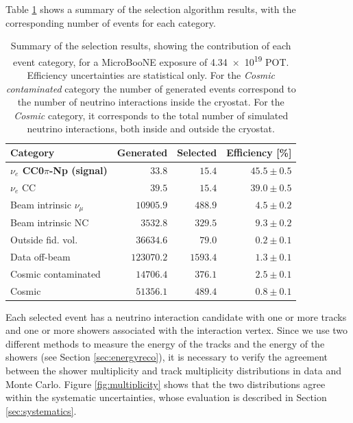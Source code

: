 Table \ref{tab:result} shows a summary of the selection algorithm results, with the corresponding number of events for each category.

\begin{table}[htbp]
   \centering
      \caption{Summary of the selection results, showing the contribution of each event category, for a MicroBooNE exposure of \num{4.34e19} POT. Efficiency uncertainties are statistical only. {For the \emph{Cosmic contaminated} category the number of generated events correspond to the number of neutrino interactions inside the cryostat. For the \emph{Cosmic} category, it corresponds to the total number of simulated neutrino interactions, both inside and outside the cryostat.}}\label{tab:result}
   \begin{tabular}{lrrr}
     \toprule
     Category & Generated & Selected & Efficiency [\%]\\
     \midrule

     \textbf{$\nu_{e}$ CC0$\pi$-Np (signal)}  & $33.8$    & $15.4$  & $45.5\pm0.5$\\
     $\nu_{e}$ CC                             & $39.5$    & $15.4$  & $39.0\pm0.5$\\
     Beam intrinsic $\nu_{\mu}$               & $10905.9$ & $488.9$ & $4.5\pm0.2$\\
     Beam intrinsic NC                        & $3532.8$  & $329.5$ & $9.3\pm0.2$\\
     Outside fid. vol.                        & $36634.6$ & $79.0$  & $0.2\pm0.1$\\
     Data off-beam                            & $123070.2$ & $1593.4$ & $1.3\pm0.1$\\
     Cosmic contaminated                      & $14706.4$  & $376.1$  & $2.5\pm0.1$\\ 
     Cosmic                                   & $51356.1$  & $489.4$  & $0.8\pm0.1$\\

     \bottomrule
   \end{tabular}

\end{table}

Each selected event has a neutrino interaction candidate with one or more tracks and one or more showers associated with the interaction vertex. Since we use two different methods to measure the energy of the tracks and the energy of the showers (see Section \ref{sec:energyreco}), it is necessary to verify the agreement between the shower multiplicity and track multiplicity distributions in data and Monte Carlo. Figure \ref{fig:multiplicity} shows that the two distributions agree within the systematic uncertainties, whose evaluation is described in Section \ref{sec:systematics}.

